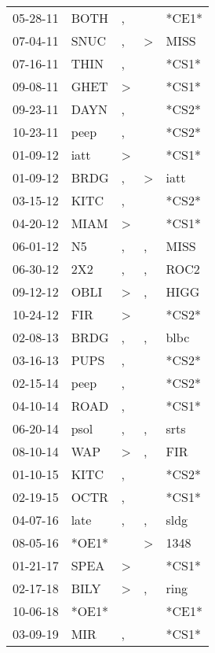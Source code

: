 \begin{supertabular}{lllll}
 05-28-11 &   BOTH &             , &               &  *CE1* \\
 07-04-11 &   SNUC &             , &  \textgreater &   MISS \\
 07-16-11 &   THIN &             , &               &  *CS1* \\
 09-08-11 &   GHET &  \textgreater &               &  *CS1* \\
 09-23-11 &   DAYN &             , &               &  *CS2* \\
 10-23-11 &   peep &             , &               &  *CS2* \\
 01-09-12 &   iatt &  \textgreater &               &  *CS1* \\
 01-09-12 &   BRDG &             , &  \textgreater &   iatt \\
 03-15-12 &   KITC &             , &               &  *CS2* \\
 04-20-12 &   MIAM &  \textgreater &               &  *CS1* \\
 06-01-12 &     N5 &             , &             , &   MISS \\
 06-30-12 &    2X2 &             , &             , &   ROC2 \\
 09-12-12 &   OBLI &  \textgreater &             , &   HIGG \\
 10-24-12 &    FIR &  \textgreater &               &  *CS2* \\
 02-08-13 &   BRDG &             , &             , &   blbc \\
 03-16-13 &   PUPS &             , &               &  *CS2* \\
 02-15-14 &   peep &             , &               &  *CS2* \\
 04-10-14 &   ROAD &             , &               &  *CS1* \\
 06-20-14 &   psol &             , &             , &   srts \\
 08-10-14 &    WAP &  \textgreater &             , &    FIR \\
 01-10-15 &   KITC &             , &               &  *CS2* \\
 02-19-15 &   OCTR &             , &               &  *CS1* \\
 04-07-16 &   late &             , &             , &   sldg \\
 08-05-16 &  *OE1* &               &  \textgreater &   1348 \\
 01-21-17 &   SPEA &  \textgreater &               &  *CS1* \\
 02-17-18 &   BILY &  \textgreater &             , &   ring \\
 10-06-18 &  *OE1* &               &               &  *CE1* \\
 03-09-19 &    MIR &             , &               &  *CS1* \\
\end{supertabular}
